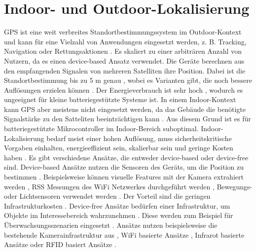 \section{Indoor- und Outdoor-Lokalisierung}
GPS ist eine weit verbreites Standortbestimmungssystem im Outdoor-Kontext  und kann für eine Vielzahl von Anwendungen eingesetzt werden,
z. B. Tracking, Navigation oder Rettungsaktionen \cite{kaplan2005understanding}.
Es skaliert zu einer arbiträren Anzahl von Nutzern, da es einen device-based Ansatz verwendet.
Die Geräte berechnen aus den empfangenden Signalen von mehreren Satelliten ihre Position.
Dabei ist die Standortbestimmung bis zu 5 m genau \cite{sadowski2018rssi},
wobei es Varianten gibt, die noch bessere Auflösungen erzielen können \cite{parkinson1996differential}.
Der Energieverbrauch ist sehr hoch \cite{jurdak2013energy}, wodurch es ungeeignet für kleine batteriegestützte Systeme ist.
In einem Indoor-Kontext kann GPS aber meistens nicht eingesetzt werden,
da das Gebäude die benötigte Signalstärke zu den Satteliten beeinträchtigen kann \cite{xiao2016survey, jin2006indoor}.
Aus diesem Grund ist es für batteriegestützte Mikrocontroller im Indoor-Bereich suboptimal.
\newline
\newline
Indoor-Lokalisierung bedarf meist einer hohen Auflösung, muss sicherheitskritische Vorgaben einhalten,
energieeffizient sein, skalierbar sein und geringe Kosten haben \cite{xiao2016survey}.
Es gibt verschiedene Ansätze, die entweder device-based oder device-free sind.
\newline
\newline
Device-based Ansätze nutzen die Sensoren des Geräts, um die Position zu bestimmen \cite{xiao2016survey}.
Beispielsweise können visuelle Features mit der Kamera extrahiert werden \cite{poulose2019hybrid, cunha2011using},
RSS Messungen des WiFi Netzwerkes durchgeführt werden \cite{pan2008transfer},
Bewegungs- oder Lichtsensoren verwendet werden \cite{poulose2019hybrid, wang2018deepml, xiao2016survey}.
Der Vorteil sind die geringen Infrastrukturkosten \cite{xiao2016survey}.
\newline
\newline
Device-free Ansätze bedürfen einer Infrastruktur, um Objekte im Interessebereich wahrzunehmen \cite{xiao2016survey}.
Diese werden zum Beispiel für Überwachsungsszenarien eingesetzt \cite{qian2018widar2}.
Ansätze nutzen beispielsweise die bestehende Kamerainfrastruktur aus \cite{kim2019info},
WiFi basierte Ansätze \cite{qian2018widar2}, Infrarot basierte Ansätze \cite{kemper2010passive}
oder RFID basiert Ansätze \cite{yang2015see}.